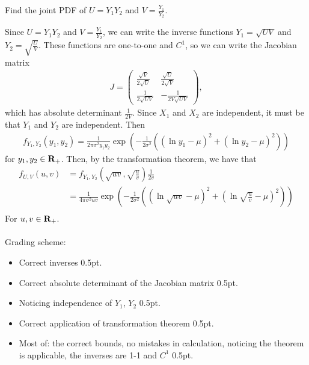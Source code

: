 \begin{exercise}[2.5]
Find the joint PDF of $U = Y_1Y_2$ and $V=\frac{Y_1}{Y_2}$.
\begin{solution}
Since $U = Y_1 Y_2$ and $V = \frac{Y_1}{Y_2}$, we can write the inverse functions $Y_1 = \sqrt{U V}$ and $Y_2 = \sqrt{\frac{U}{V}}$. These functions are one-to-one and $C^1$, so we can write the Jacobian matrix
\begingroup
\renewcommand*{\arraystretch}{1.5}
\begin{align*}
    J = \begin{pmatrix}
    \frac{\sqrt{V}}{2\sqrt{U}} & \frac{\sqrt{U}}{2\sqrt{V}}\\
    \frac{1}{2\sqrt{U V}} & -\frac{1}{2V\sqrt{U V}}
    \end{pmatrix},
\end{align*}
\endgroup
which has absolute determinant $\frac{1}{2V}$. Since $X_1$ and $X_2$ are independent, it must be that $Y_1$ and $Y_2$ are independent. Then
\begin{align*}
    f_{Y_1,Y_2}(y_1,y_2) = \frac{1}{2\pi\sigma^2 y_1 y_2}\exp{\left(-\frac{1}{2\sigma^2}\left((\ln{y_1}-\mu)^2 + (\ln{y_2}-\mu)^2\right)\right)}
\end{align*}
for $y_1,y_2\in\bf{R}_+$. Then, by the transformation theorem, we have that
\begin{align*}
    f_{U,V}(u,v) &= f_{{Y_1,Y_2}}\left(\sqrt{u v},\sqrt{\frac{u}{v}}\right)\frac{1}{2v}\\
    &= \frac{1}{4\pi\sigma^2u v}\exp{\left(-\frac{1}{2\sigma^2}\left((\ln{\sqrt{u v}}-\mu)^2 + (\ln{\sqrt{\frac{u}{v}}}-\mu)^2\right)\right)}\\
\end{align*}
For $u,v\in\bf{R}_+$.
\\\\
Grading scheme:
\begin{itemize}
    \item Correct inverses 0.5pt.
    \item Correct absolute determinant of the Jacobian matrix 0.5pt.
    \item Noticing independence of $Y_1$, $Y_2$ 0.5pt.
    \item Correct application of transformation theorem 0.5pt.
    \item Most of: the correct bounds, no mistakes in calculation, noticing the theorem is applicable, the inverses are 1-1 and $C^1$ 0.5pt.
\end{itemize}
\end{solution}
\end{exercise}
